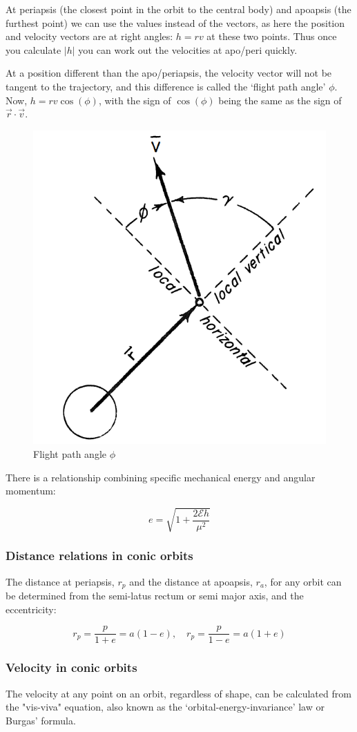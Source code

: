 \documentclass{report}
\begin{document}
At periapsis (the closest point in the orbit to the central body) and apoapsis (the furthest point) we can use the values instead of the vectors, as here the position and velocity vectors are at right angles: $h = rv$ at these two points. Thus once you calculate $|h|$ you can work out the velocities at apo/peri quickly.

At a position different than the apo/periapsis, the velocity vector will not be tangent to the trajectory, and this difference is called the `flight path angle' $\phi$. Now, $h = rv \cos{(\phi)}$, with the sign of $\cos{(\phi)}$ being the same as the sign of $\vec{r} \cdot \vec{v}$.

\begin{figure}[H]
    \centering
    \includegraphics[width=0.4\linewidth]{Latex Images/flightpathangle.png}
    \caption{Flight path angle $\phi$}
    \label{fig:flightpath}
\end{figure}

There is a relationship combining specific mechanical energy and angular momentum:

$$
e = \sqrt{1+\frac{2\mathcal{E}h}{\mu ^2}}
$$

\subsubsection{Distance relations in conic orbits}

The distance at periapsis, $r_p$ and the distance at apoapsis, $r_a$, for any orbit can be determined from the semi-latus rectum or semi major axis, and the eccentricity:

$$
r_p = \frac{p}{1+e} = a(1-e), \quad r_p = \frac{p}{1-e} = a(1+e)
$$

\subsubsection{Velocity in conic orbits}

The velocity at any point on an orbit, regardless of shape, can be calculated from the "vis-viva" equation, also known as the `orbital-energy-invariance' law or Burgas' formula.
\end{document}
